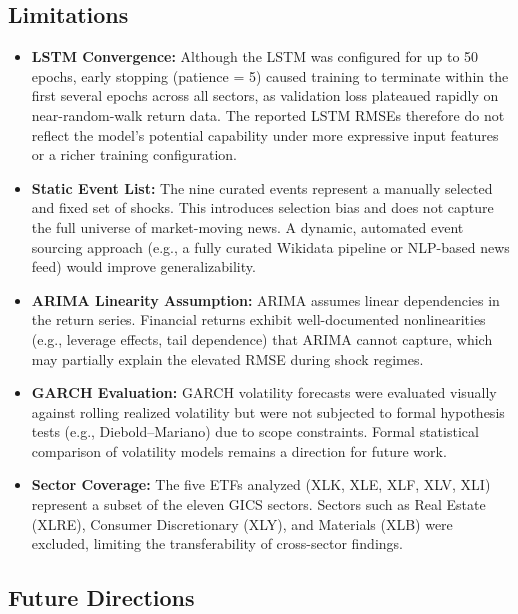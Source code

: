 \documentclass[12pt]{article}
\begin{document}
\subsection{Limitations}
\begin{itemize}
    \item \textbf{LSTM Convergence:} Although the LSTM was configured for up to 50 epochs, early stopping (patience = 5) caused training to terminate within the first several epochs across all sectors, as validation loss plateaued rapidly on near-random-walk return data. The reported LSTM RMSEs therefore do not reflect the model's potential capability under more expressive input features or a richer training configuration.

    \item \textbf{Static Event List:} The nine curated events represent a manually selected and fixed set of shocks. This introduces selection bias and does not capture the full universe of market-moving news. A dynamic, automated event sourcing approach (e.g., a fully curated Wikidata pipeline or NLP-based news feed) would improve generalizability.

    \item \textbf{ARIMA Linearity Assumption:} ARIMA assumes linear dependencies in the return series. Financial returns exhibit well-documented nonlinearities (e.g., leverage effects, tail dependence) that ARIMA cannot capture, which may partially explain the elevated RMSE during shock regimes.

    \item \textbf{GARCH Evaluation:} GARCH volatility forecasts were evaluated visually against rolling realized volatility but were not subjected to formal hypothesis tests (e.g., Diebold--Mariano) due to scope constraints. Formal statistical comparison of volatility models remains a direction for future work.

    \item \textbf{Sector Coverage:} The five ETFs analyzed (XLK, XLE, XLF, XLV, XLI) represent a subset of the eleven GICS sectors. Sectors such as Real Estate (XLRE), Consumer Discretionary (XLY), and Materials (XLB) were excluded, limiting the transferability of cross-sector findings.
\end{itemize}

\subsection{Future Directions}
\end{document}
